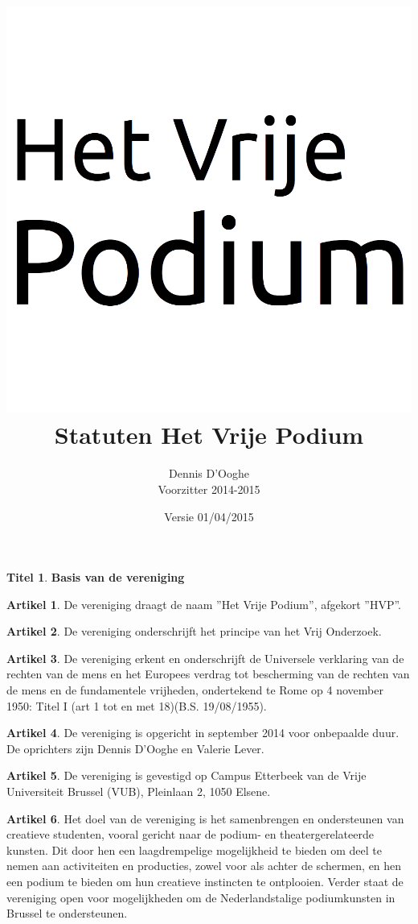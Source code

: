 \documentclass[a4paper,10pt]{article}
\title{\vspace{-2.0cm}\includegraphics[scale=0.3]{img/logo.png}\\
  \vspace{1cm}Statuten Het Vrije Podium}
\author{Dennis D'Ooghe\\Voorzitter 2014-2015}
\date{Versie 01/04/2015} %
\theoremstyle{definition}
\newtheorem{titel}{\newline\Large Titel}
\newtheorem{artikel}{\large Artikel}
\newcommand{\ttext}[1]{\Large \textbf{#1} \normalsize}
\newcommand{\ttextcr}{\hfill\newline}
\begin{document}
\maketitle

\begin{versionhistory}
\end{versionhistory}

\newpage


\begin{titel}\ttext{Basis van de vereniging}

  \begin{artikel}\ttextcr
    De vereniging draagt de naam ''Het Vrije Podium'', afgekort ''HVP''.
  \end{artikel}

  \begin{artikel}\ttextcr
    De vereniging onderschrijft het principe van het Vrij Onderzoek.
  \end{artikel}

  \begin{artikel}\ttextcr
    De vereniging erkent en onderschrijft de Universele verklaring van de rechten van de mens en het Europees verdrag tot bescherming van de rechten van de mens en de fundamentele vrijheden, ondertekend te Rome op 4 november 1950: Titel I (art 1 tot en met 18)(B.S. 19/08/1955).
  \end{artikel}

  \begin{artikel}\label{kring-oprichting}\ttextcr
    De vereniging is opgericht in september 2014 voor onbepaalde duur.
    De oprichters zijn Dennis D'Ooghe en Valerie Lever.
  \end{artikel}

  \begin{artikel}\ttextcr
    De vereniging is gevestigd op Campus Etterbeek van de Vrije Universiteit Brussel (VUB), Pleinlaan 2, 1050 Elsene.
  \end{artikel}

  \begin{artikel}\ttextcr
    Het doel van de vereniging is het samenbrengen en ondersteunen van creatieve studenten, vooral gericht naar de podium- en theatergerelateerde kunsten.
    Dit door hen een laagdrempelige mogelijkheid te bieden om deel te nemen aan activiteiten en producties, zowel voor als achter de schermen, en hen een podium te bieden om hun creatieve instincten te ontplooien.
    Verder staat de vereniging open voor mogelijkheden om de Nederlandstalige podiumkunsten in Brussel te ondersteunen.
  \end{artikel}


\end{titel}
\end{document}
